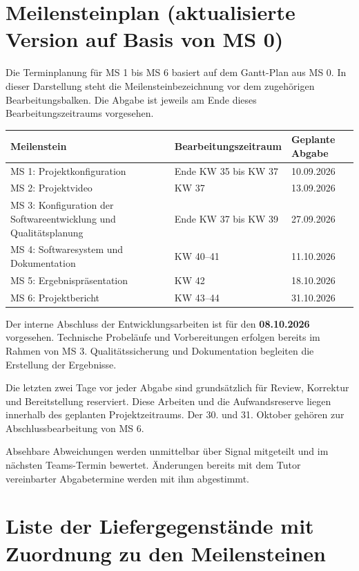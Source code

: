 \documentclass[11pt,a4paper]{article}
\begin{document}
\section{Meilensteinplan (aktualisierte Version auf Basis von MS 0)}

Die Terminplanung für MS 1 bis MS 6 basiert auf dem Gantt-Plan aus MS 0. In dieser Darstellung steht die Meilensteinbezeichnung vor dem zugehörigen Bearbeitungsbalken. Die Abgabe ist jeweils am Ende dieses Bearbeitungszeitraums vorgesehen.

\begin{tabularx}{\linewidth}{@{}Y p{3.2cm} l@{}}
\toprule
\textbf{Meilenstein} & \textbf{Bearbeitungs\-zeitraum} & \textbf{Geplante Abgabe} \\
\midrule
MS 1: Projektkonfiguration & Ende KW 35 bis KW 37 & 10.09.2026 \\
MS 2: Projektvideo & KW 37 & 13.09.2026 \\
MS 3: Konfiguration der Softwareentwicklung und Qualitätsplanung & Ende KW 37 bis KW 39 & 27.09.2026 \\
MS 4: Softwaresystem und Dokumentation & KW 40–41 & 11.10.2026 \\
MS 5: Ergebnispräsentation & KW 42 & 18.10.2026 \\
MS 6: Projektbericht & KW 43–44 & 31.10.2026 \\
\bottomrule
\end{tabularx}

Der interne Abschluss der Entwicklungsarbeiten ist für den \textbf{08.10.2026} vorgesehen. Technische Probeläufe und Vorbereitungen erfolgen bereits im Rahmen von MS 3. Qualitätssicherung und Dokumentation begleiten die Erstellung der Ergebnisse.

Die letzten zwei Tage vor jeder Abgabe sind grundsätzlich für Review, Korrektur und Bereitstellung reserviert. Diese Arbeiten und die Aufwandsreserve liegen innerhalb des geplanten Projektzeitraums. Der 30. und 31. Oktober gehören zur Abschlussbearbeitung von MS 6.

Absehbare Abweichungen werden unmittelbar über Signal mitgeteilt und im nächsten Teams-Termin bewertet. Änderungen bereits mit dem Tutor vereinbarter Abgabetermine werden mit ihm abgestimmt.

\section{Liste der Liefergegenstände mit Zuordnung zu den Meilensteinen}
\end{document}
